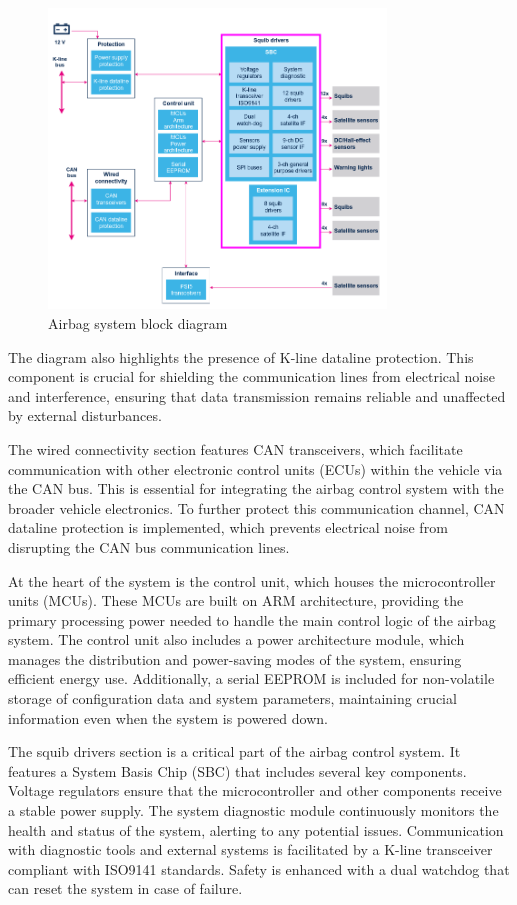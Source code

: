 \documentclass[12pt	]{article}
\begin{document}
\begin{figure}[h]
	\centering
	\includegraphics[width=0.8\textwidth]{Images/img9.png}
	\caption{Airbag system block diagram}
	\label{fig:Airbag system block diagram}
\end{figure}

The diagram also highlights the presence of K-line dataline protection. This component is crucial for shielding the communication lines from electrical noise and interference, ensuring that data transmission remains reliable and unaffected by external disturbances.

The wired connectivity section features CAN transceivers, which facilitate communication with other electronic control units (ECUs) within the vehicle via the CAN bus. This is essential for integrating the airbag control system with the broader vehicle electronics. To further protect this communication channel, CAN dataline protection is implemented, which prevents electrical noise from disrupting the CAN bus communication lines.

At the heart of the system is the control unit, which houses the microcontroller units (MCUs). These MCUs are built on ARM architecture, providing the primary processing power needed to handle the main control logic of the airbag system. The control unit also includes a power architecture module, which manages the distribution and power-saving modes of the system, ensuring efficient energy use. Additionally, a serial EEPROM is included for non-volatile storage of configuration data and system parameters, maintaining crucial information even when the system is powered down.

The squib drivers section is a critical part of the airbag control system. It features a System Basis Chip (SBC) that includes several key components. Voltage regulators ensure that the microcontroller and other components receive a stable power supply. The system diagnostic module continuously monitors the health and status of the system, alerting to any potential issues. Communication with diagnostic tools and external systems is facilitated by a K-line transceiver compliant with ISO9141 standards. Safety is enhanced with a dual watchdog that can reset the system in case of failure.
\end{document}
